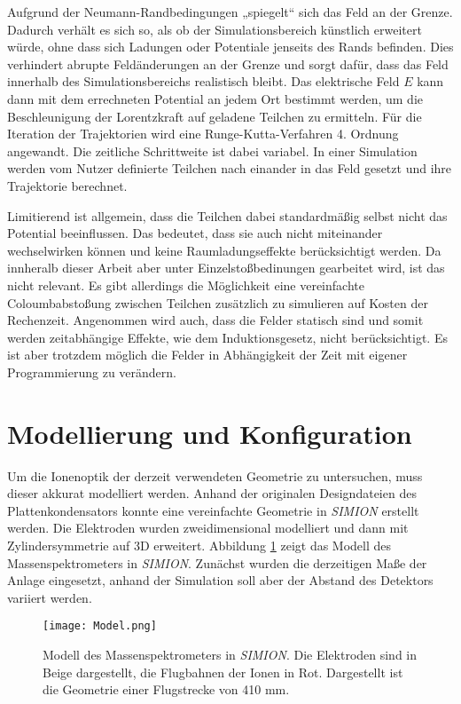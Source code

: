 Aufgrund der Neumann-Randbedingungen „spiegelt“ sich das Feld an der Grenze. Dadurch verhält es sich so, als ob der Simulationsbereich künstlich erweitert würde, ohne dass sich Ladungen oder Potentiale jenseits des Rands befinden. Dies verhindert abrupte Feldänderungen an der Grenze und sorgt dafür, dass das Feld innerhalb des Simulationsbereichs realistisch bleibt. Das elektrische Feld $E$ kann dann mit dem errechneten Potential an jedem Ort bestimmt werden, um die Beschleunigung der Lorentzkraft auf geladene Teilchen zu ermitteln. Für die Iteration der Trajektorien wird eine Runge-Kutta-Verfahren 4. Ordnung angewandt. Die zeitliche Schrittweite ist dabei variabel. In einer Simulation werden vom Nutzer definierte Teilchen nach einander in das Feld gesetzt und ihre Trajektorie berechnet. 

Limitierend ist allgemein, dass die Teilchen dabei standardmäßig selbst nicht das Potential beeinflussen. Das bedeutet, dass sie auch nicht miteinander wechselwirken können und keine Raumladungseffekte berücksichtigt werden. Da innheralb dieser Arbeit aber unter Einzelstoßbedinungen gearbeitet wird, ist das nicht relevant. Es gibt allerdings die Möglichkeit eine vereinfachte Coloumbabstoßung zwischen Teilchen zusätzlich zu simulieren auf Kosten der Rechenzeit. Angenommen wird auch, dass die Felder statisch sind und somit werden zeitabhängige Effekte, wie dem Induktionsgesetz, nicht berücksichtigt. Es ist aber trotzdem möglich die Felder in Abhängigkeit der Zeit mit eigener Programmierung zu verändern.

\section{Modellierung und Konfiguration}
Um die Ionenoptik der derzeit verwendeten Geometrie zu untersuchen, muss dieser akkurat modelliert werden. Anhand der originalen Designdateien des Plattenkondensators konnte eine vereinfachte Geometrie in \textit{SIMION} erstellt werden. Die Elektroden wurden zweidimensional modelliert und dann mit Zylindersymmetrie auf 3D erweitert. Abbildung \ref{fig:model} zeigt das Modell des Massenspektrometers in \textit{SIMION}. Zunächst wurden die derzeitigen Maße der Anlage eingesetzt, anhand der Simulation soll aber der Abstand des Detektors variiert werden.

\begin{figure}
    \centering
    \texttt{[image: Model.png]}
    \caption[Modell des Massenspektrometers in \textit{SIMION}]{Modell des Massenspektrometers in \textit{SIMION}. Die Elektroden sind in Beige dargestellt, die Flugbahnen der Ionen in Rot. Dargestellt ist die Geometrie einer Flugstrecke von 410 mm.}
    \label{fig:model}
\end{figure}

